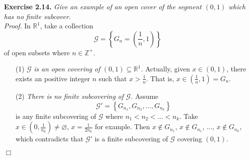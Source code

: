 \documentclass{article}
\begin{document}
\textbf{Exercise 2.14.}
\emph{Give an example of an open cover of the segment $(0, 1)$
which has no finite subcover.} \\

\emph{Proof.}
In $\mathbb{R}^1$, take a collection
$$\mathscr{G} = \left\{ G_n = \left(\frac{1}{n}, 1\right) \right\}$$
of open subsets where $n \in \mathbb{Z}^+$.
\begin{enumerate}
\item[(1)]
\emph{$\mathscr{G}$ is an open covering of $(0, 1) \subseteq \mathbb{R}^1$.}
Actually, given $x \in (0, 1)$, there exists an positive integer $n$ such that $x > \frac{1}{n}$.
That is, $x \in \left(\frac{1}{n}, 1\right) = G_n$.
\item[(2)]
\emph{There is no finite subcovering of $\mathscr{G}$.}
Assume $$\mathscr{G}' = \left\{ G_{n_1}, G_{n_2}, ..., G_{n_k} \right\}$$
is any finite subcovering of $\mathscr{G}$ where $n_1 < n_2 < ... < n_k$.
Take $x \in \left(0, \frac{1}{n_k}\right) \neq \varnothing$,
$x = \frac{1}{2 n_k}$ for example.
Then $x \not\in G_{n_1}$, $x \not\in G_{n_1}$, ..., $x \not\in G_{n_k}$,
which contradicts that $\mathscr{G}'$ is a finite subcovering of $\mathscr{G}$ covering $(0, 1)$.
\end{enumerate}
$\Box$ \\\\
\end{document}
